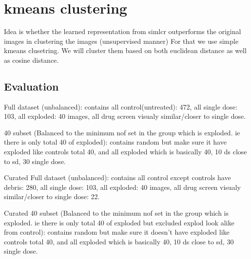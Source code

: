 \section{kmeans clustering}

Idea is whether the learned representation from simlcr outperforms the original images in clustering the images (unsupervised manner) For that we use simple kmeans 
clusetring. We will cluster them based on both euclidean distance as well as cosine distance.





\subsection{Evaluation}

Full dataset (unbalanced): contains all control(untreated): 472, all single dose: 103, all exploded: 40 images, all drug screen visualy similar/closer to single dose.

40 subset (Balanced to the minimum nof set in the group which is exploded. ie there is only total 40 of exploded): contains random but make sure it have exploded like 
controls total 40, and all exploded which is basically 40, 10 ds close to sd, 30 single dose.

Curated Full dataset (unbalanced): contains all control except controls have debris: 280, all single dose: 103, all exploded: 40 images, all drug screen visualy 
similar/closer to single dose: 22.

Curated 40 subset  (Balanced to the minimum nof set in the group which is exploded. ie there is only total 40 of exploded but excluded explod look alike from control):
contains random but make sure it doesn't have exploded like controls total 40, and all exploded which is basically 40, 10 ds close to sd, 30 single dose.

\begin{table}[H]
\centering
\caption{Summary of Datasets}
\label{tab:dataset_summary}
\end{table}

